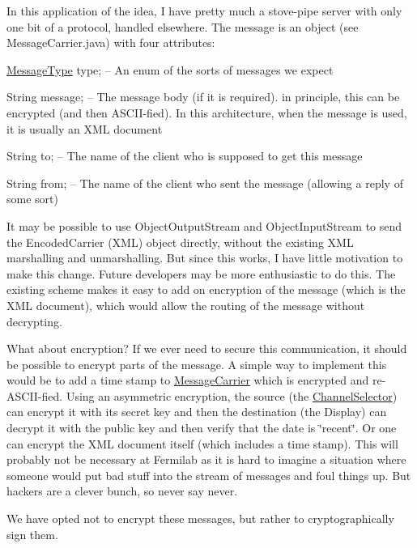 In this application of the idea, I have pretty much a stove-\/pipe server with only one bit of a protocol, handled elsewhere. The message is an object (see Message\-Carrier.\-java) with four attributes\-: 
\begin{DoxyItemize}
\item \hyperlink{enumgov_1_1fnal_1_1ppd_1_1dd_1_1chat_1_1MessageType}{Message\-Type} type; -- An enum of the sorts of messages we expect 
\item String message; -- The message body (if it is required). in principle, this can be encrypted (and then A\-S\-C\-I\-I-\/fied). In this architecture, when the message is used, it is usually an X\-M\-L document 
\item String to; -- The name of the client who is supposed to get this message 
\item String from; -- The name of the client who sent the message (allowing a reply of some sort) 
\end{DoxyItemize}

It may be possible to use Object\-Output\-Stream and Object\-Input\-Stream to send the Encoded\-Carrier (X\-M\-L) object directly, without the existing X\-M\-L marshalling and unmarshalling. But since this works, I have little motivation to make this change. Future developers may be more enthusiastic to do this. The existing scheme makes it easy to add on encryption of the message (which is the X\-M\-L document), which would allow the routing of the message without decrypting. 

What about encryption? If we ever need to secure this communication, it should be possible to encrypt parts of the message. A simple way to implement this would be to add a time stamp to \hyperlink{classgov_1_1fnal_1_1ppd_1_1dd_1_1chat_1_1xml_1_1MessageCarrier}{Message\-Carrier} which is encrypted and re-\/\-A\-S\-C\-I\-I-\/fied. Using an asymmetric encryption, the source (the \hyperlink{classgov_1_1fnal_1_1ppd_1_1dd_1_1ChannelSelector}{Channel\-Selector}) can encrypt it with its secret key and then the destination (the Display) can decrypt it with the public key and then verify that the date is \char`\"{}recent\char`\"{}. Or one can encrypt the X\-M\-L document itself (which includes a time stamp). This will probably not be necessary at Fermilab as it is hard to imagine a situation where someone would put bad stuff into the stream of messages and foul things up. But hackers are a clever bunch, so never say never. 

We have opted not to encrypt these messages, but rather to cryptographically sign them. 

